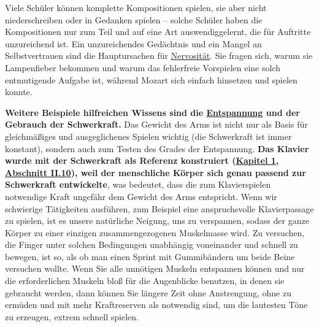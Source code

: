 Viele Schüler können komplette Kompositionen spielen, sie aber nicht niederschreiben oder in Gedanken spielen -- solche Schüler haben die Kompositionen nur zum Teil und auf eine Art auswendiggelernt, die für Auftritte unzureichend ist.
Ein unzureichendes Gedächtnis und ein Mangel an Selbstvertrauen sind die Hauptursachen für \hyperref[c1iii15]{Nervosität}.
Sie fragen sich, warum sie Lampenfieber bekommen und warum das fehlerfreie Vorspielen eine solch entmutigende Aufgabe ist, während Mozart sich einfach hinsetzen und spielen konnte.

\textbf{Weitere Beispiele hilfreichen Wissens sind die \hyperref[c1ii14]{Entspannung} und der Gebrauch der Schwerkraft.}
Das Gewicht des Arms ist nicht nur als Basis für gleichmäßiges und ausgeglichenes Spielen wichtig (die Schwerkraft ist immer konstant), sondern auch zum Testen des Grades der Entspannung.
\textbf{Das Klavier wurde mit der Schwerkraft als Referenz konstruiert (\hyperref[c1ii10]{Kapitel 1, Abschnitt II.10}), weil der menschliche Körper sich genau passend zur Schwerkraft entwickelte}, was bedeutet, dass die zum Klavierspielen notwendige Kraft ungefähr dem Gewicht des Arms entspricht.
Wenn wir schwierige Tätigkeiten ausführen, zum Beispiel eine anspruchsvolle Klavierpassage zu spielen, ist es unsere natürliche Neigung, uns zu verspannen, sodass der ganze Körper zu einer einzigen zusammengezogenen Muskelmasse wird.
Zu versuchen, die Finger unter solchen Bedingungen unabhängig voneinander und schnell zu bewegen, ist so, als ob man einen Sprint mit Gummibändern um beide Beine versuchen wollte.
Wenn Sie alle unnötigen Muskeln entspannen können und nur die erforderlichen Muskeln bloß für die Augenblicke benutzen, in denen sie gebraucht werden, dann können Sie längere Zeit ohne Anstrengung, ohne zu ermüden und mit mehr Kraftreserven als notwendig sind, um die lautesten Töne zu erzeugen, extrem schnell spielen. 

